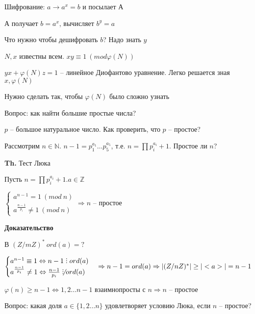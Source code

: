 \documentclass[14pt, letter paper]{article}
\def\divby{%
  \mathrel{\text{\vbox{\baselineskip.65ex\lineskiplimit0pt\hbox{.}\hbox{.}\hbox{.}}}}%
}
\begin{document}
Шифрование: $a \rightarrow a^x = b$ и посылает А

А получает $b = a^x$, вычисляет $b^y = a$

\vspace{5mm}

Что нужно чтобы дешифровать $b$? Надо знать $y$

$N, x$ известны всем. $xy \equiv 1\ (mod \varphi(N))$

$yx + \varphi(N)z = 1$ -- линейное Диофантово уравнение. Легко решается зная $x, \varphi(N)$

Нужно сделать так, чтобы $\varphi(N)$ было сложно узнать

\vspace{5mm}

Вопрос: как найти большие простые числа?

$p$ -- большое натуральное число. Как проверить, что $p$ -- простое?

Рассмотрим $n \in \mathds{N}$. $n - 1 = p_1^{a_1} \ldots p_5^{a_5}$, т.е. $n = \prod p_i^{a_i} + 1$. Простое ли $n$?

\vspace{5mm}

\textbf{Th.} Тест Люка

Пусть $n = \prod p_i^{a_i} + 1. a \in \mathds{Z}$

$\begin{cases}
    a^{n-1} = 1\ (mod\ n)\\
    a^\frac{n-1}{p_i} \neq 1\ (mod\ n)
\end{cases} \Rightarrow n$ -- простое

\begin{center}
    \textbf{Доказательство}
\end{center}

В $(Z/mZ)^*\ ord(a) = ?$

$\begin{cases}
    a^{n-1} \equiv 1 \Leftrightarrow n - 1 \divby ord(a) \\
    a^\frac{n-1}{p_i} \neq 1 \Leftrightarrow \frac{n-1}{p_i} \not\divby ord(a)
\end{cases} \Rightarrow n - 1 = ord(a) \Rightarrow |(Z/nZ)^*| \geq |<a>| = n - 1$

$\varphi(n) \geq n - 1 \Leftrightarrow 1, 2 \ldots n-1$ взаимнопросты с $n \Rightarrow n$ -- простое

\vspace{5mm}

Вопрос: какая доля $a \in \{1, 2 \ldots n\}$ удовлетворяет условию Люка, если $n$ -- простое?
\end{document}

